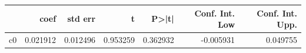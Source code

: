 \begin{tabular}{lrrrrrr}
\toprule
 & coef & std err & t & P>|t| & Conf. Int. Low & Conf. Int. Upp. \\
\midrule
c0 & 0.021912 & 0.012496 & 0.953259 & 0.362932 & -0.005931 & 0.049755 \\
\bottomrule
\end{tabular}